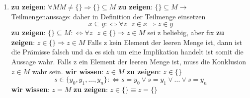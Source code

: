 \documentclass[a4paper]{article}
\begin{document}
\begin{enumerate}
		\item
		\textbf{zu zeigen}: $\forall M M \neq \{\} \Rightarrow \{\} \subseteq M$
		\newline
		\textbf{zu zeigen}: $\{\} \subseteq M \rightarrow$ Teilmengenaussage: daher in Definition der Teilmenge einsetzen
		\begin{equation*}
			x \subseteq y : \Leftrightarrow \forall z \text{ } z \in x \Rightarrow z \in y
		\end{equation*}
		\textbf{zu zeigen}: $\{\} \subseteq M :\Leftrightarrow \forall z \text{ } z \in \{\} \Rightarrow z \in M$
		\newline
		sei z beliebig, aber fix
		\newline
		\textbf{zu zeigen}: $z \in \{\} \Rightarrow z \in M$
		\newline
		Falls z kein Element der leeren Menge ist, dann ist die Prämisse falsch und da es sich um eine Implikation handelt ist somit die Aussage wahr.
		\newline
		Falls z ein Element der leeren Menge ist, muss die Konklusion $z \in M$ wahr sein.
		\newline
		\textbf{wir wissen}: $z \in M$
		\newline
		\textbf{zu zeigen}: $z \in \{\}$
		\begin{equation*}
			s \in \{y_{0}, y_{1}, ..., y_{n}\} :\Leftrightarrow s = y_{0} \lor s = y_{1} \lor ... \lor s = y_{n}
		\end{equation*}
		\textbf{wir wissen}: $z = M$
		\newline
		\textbf{zu zeigen}: $z \in \{\} \equiv z = \{\}$
	\end{enumerate}
\end{document}
